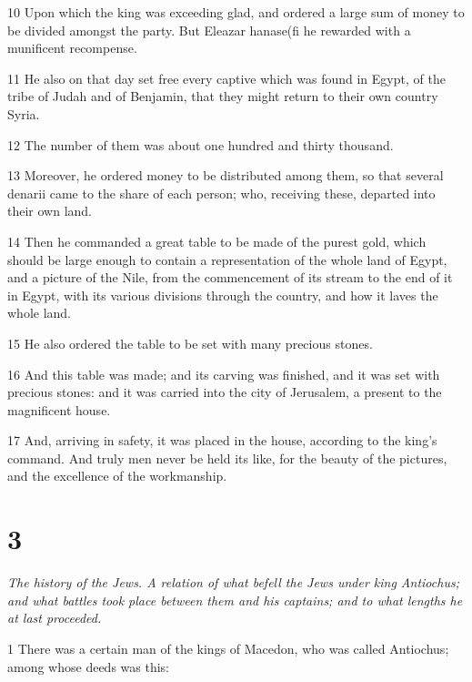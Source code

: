 \par 10 Upon which the king was exceeding glad, and ordered a large sum of money to be divided amongst the party. But Eleazar hanase(fi he rewarded with a munificent recompense. 

\par 11 He also on that day set free every captive which was found in Egypt, of the tribe of Judah and of Benjamin, that they might return to their own country Syria. 

\par 12 The number of them was about one hundred and thirty thousand. 

\par 13 Moreover, he ordered money to be distributed among them, so that several denarii came to the share of each person; who, receiving these, departed into their own land. 

\par 14 Then he commanded a great table to be made of the purest gold, which should be large enough to contain a representation of the whole land of Egypt, and a picture of the Nile, from the commencement of its stream to the end of it in Egypt, with its various divisions through the country, and how it laves the whole land. 

\par 15 He also ordered the table to be set with many precious stones. 

\par 16 And this table was made; and its carving was finished, and it was set with precious stones: and it was carried into the city of Jerusalem, a present to the magnificent house. 

\par 17 And, arriving in safety, it was placed in the house, according to the king’s command. And truly men never be held its like, for the beauty of the pictures, and the excellence of the workmanship. 

\chapter{3}

\par \textit{The history of the Jews. A relation of what befell the Jews under king Antiochus; and what battles took place between them and his captains; and to what lengths he at last proceeded.}

\par 1 There was a certain man of the kings of Macedon, who was called Antiochus; among whose deeds was this: 

